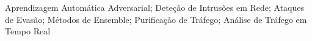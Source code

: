 \acresetall
\noindent Aprendizagem Automática Adversarial; Deteção de Intrusões em Rede; Ataques de Evasão; Métodos de Ensemble; Purificação de Tráfego; Análise de Tráfego em Tempo Real